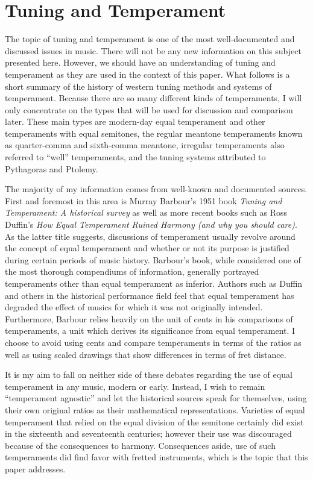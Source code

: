 \chapter{Tuning and Temperament}

The topic of tuning and temperament is one of the most well-documented and
discussed issues in music.  There will not be any new information on this subject presented
here.
However, we should have an understanding of tuning and temperament as they are used in the context of
this paper. What follows is a short summary of the history of western tuning methods and
systems of temperament.  Because there are so many different kinds of
temperaments, I will only concentrate on the types that will be used for
discussion and comparison later.  These main types are modern-day equal
temperament and other temperaments with equal semitones, the regular meantone
temperaments known as quarter-comma and sixth-comma meantone, irregular temperaments
also referred to ``well'' temperaments, and the tuning
systems attributed to Pythagoras and Ptolemy.

The majority of my information comes from well-known and documented sources.
First and foremost in this area is Murray Barbour's 1951 book \textit{Tuning and
Temperament: A historical survey} as well as more recent books such as Ross
Duffin's \textit{How Equal Temperament Ruined Harmony (and why you should
care)}.  As the latter title suggests, discussions of temperament usually
revolve around the concept of equal temperament and whether or not its purpose
is justified during certain periods of music history.  Barbour's book, while
considered one of the most thorough compendiums of information, generally
portrayed temperaments other than equal temperament as inferior. Authors such as
Duffin and others in the historical performance field feel that equal
temperament has degraded the effect of musics for which it was not originally
intended.  Furthermore, Barbour relies heavily on the unit of cents in his
comparisons of temperaments, a unit which derives its significance from equal
temperament.  I choose to avoid using cents and compare temperaments in terms of
the ratios as well as using scaled drawings that show differences in terms of
fret distance.

It is my aim to fall on neither side of these debates regarding the use
of equal temperament in any music, modern or early.  Instead, I wish to remain
``temperament agnostic'' and let the historical sources speak for themselves,
using their own original ratios as their mathematical representations.
Varieties of equal temperament that relied on the equal division of the
semitone certainly did exist in the sixteenth and seventeenth centuries;
however their use was discouraged because of the consequences to harmony.
Consequences aside, use of such temperaments did find favor with fretted
instruments, which is the topic that this paper addresses.

